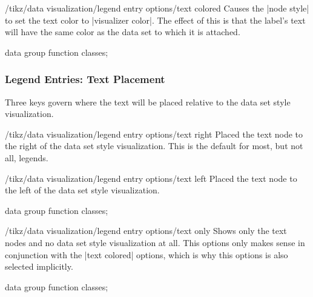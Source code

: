 \begin{key}{/tikz/data visualization/legend entry options/text colored}
    Causes the |node style| to set the text color to |visualizer color|. The
    effect of this is that the label's text will have the same color as the
    data set to which it is attached.
\begin{codeexample}[width=8cm]
\tikz \datavisualization [
  scientific axes,
  visualize as smooth line/.list=
    {log, lin, squared, exp},
  legend={label style=text colored},
  log=    {label in legend={text=$\log x$}},
  lin=    {label in legend={text=$x/2$}},
  squared={label in legend={text=$x^2$}},
  exp=    {label in legend={text=$e^x$}},
  style sheet=strong colors]
data group {function classes};
\end{codeexample}
\end{key}


\subsubsection{Legend Entries: Text Placement}

Three keys govern where the text will be placed relative to the data set style
visualization.

\begin{key}{/tikz/data visualization/legend entry options/text right}
    Placed the text node to the right of the data set style visualization. This
    is the default for most, but not all, legends.
\end{key}
%
\begin{key}{/tikz/data visualization/legend entry options/text left}
    Placed the text node to the left of the data set style visualization.
\begin{codeexample}[width=8cm]
\tikz \datavisualization [
  scientific axes,
  visualize as smooth line/.list=
    {log, lin, squared, exp},
  legend={label style=text left},
  log=    {label in legend={text=$\log x$}},
  lin=    {label in legend={text=$x/2$}},
  squared={label in legend={text=$x^2$}},
  exp=    {label in legend={text=$e^x$}},
  style sheet=strong colors]
data group {function classes};
\end{codeexample}
\end{key}
%
\begin{key}{/tikz/data visualization/legend entry options/text only}
    Shows only the text nodes and no data set style visualization at all. This
    options only makes sense in conjunction with the |text colored| options,
    which is why this options is also selected implicitly.
\begin{codeexample}[width=8cm]
\tikz \datavisualization [
  scientific axes,
  visualize as smooth line/.list=
    {log, lin, squared, exp},
  legend={south east inside, rows=2,
          label style=text only},
  log=    {label in legend={text=$\log x$}},
  lin=    {label in legend={text=$x/2$}},
  squared={label in legend={text=$x^2$}},
  exp=    {label in legend={text=$e^x$}},
  style sheet=strong colors]
data group {function classes};
\end{codeexample}
\end{key}



